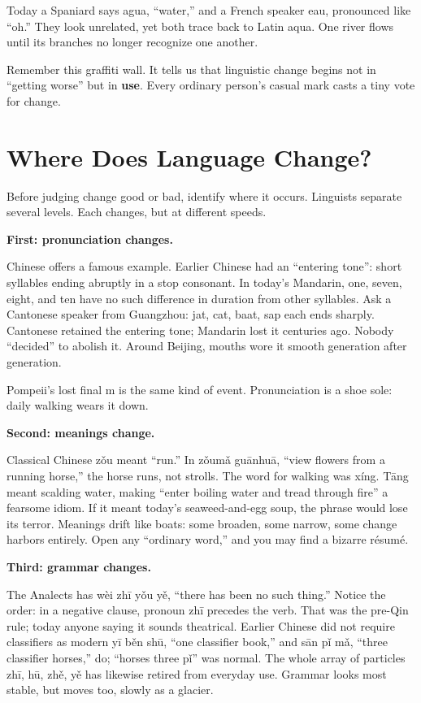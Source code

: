 Today a Spaniard says agua, ``water,'' and a French speaker eau, pronounced like ``oh.'' They look unrelated, yet both trace back to Latin aqua. One river flows until its branches no longer recognize one another.

Remember this graffiti wall. It tells us that linguistic change begins not in ``getting worse'' but in \textbf{use}. Every ordinary person's casual mark casts a tiny vote for change.

\section{Where Does Language Change?}
Before judging change good or bad, identify where it occurs. Linguists separate several levels. Each changes, but at different speeds.

\textbf{First: pronunciation changes.}

Chinese offers a famous example. Earlier Chinese had an ``entering tone'': short syllables ending abruptly in a stop consonant. In today's Mandarin, one, seven, eight, and ten have no such difference in duration from other syllables. Ask a Cantonese speaker from Guangzhou: jat, cat, baat, sap each ends sharply. Cantonese retained the entering tone; Mandarin lost it centuries ago. Nobody ``decided'' to abolish it. Around Beijing, mouths wore it smooth generation after generation.

Pompeii's lost final m is the same kind of event. Pronunciation is a shoe sole: daily walking wears it down.

\textbf{Second: meanings change.}

Classical Chinese zǒu meant ``run.'' In zǒumǎ guānhuā, ``view flowers from a running horse,'' the horse runs, not strolls. The word for walking was xíng. Tāng meant scalding water, making ``enter boiling water and tread through fire'' a fearsome idiom. If it meant today's seaweed-and-egg soup, the phrase would lose its terror. Meanings drift like boats: some broaden, some narrow, some change harbors entirely. Open any ``ordinary word,'' and you may find a bizarre résumé.

\textbf{Third: grammar changes.}

The Analects has wèi zhī yǒu yě, ``there has been no such thing.'' Notice the order: in a negative clause, pronoun zhī precedes the verb. That was the pre-Qin rule; today anyone saying it sounds theatrical. Earlier Chinese did not require classifiers as modern yī běn shū, ``one classifier book,'' and sān pǐ mǎ, ``three classifier horses,'' do; ``horses three pǐ'' was normal. The whole array of particles zhī, hū, zhě, yě has likewise retired from everyday use. Grammar looks most stable, but moves too, slowly as a glacier.


